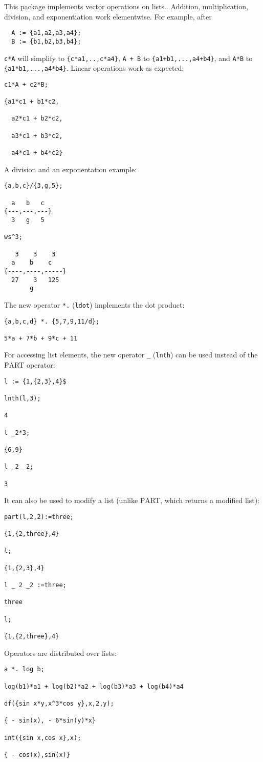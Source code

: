 
This package implements vector operations on lists..
Addition, multiplication, division, and exponentiation work elementwise.
For example, after
\begin{verbatim}
  A := {a1,a2,a3,a4};
  B := {b1,b2,b3,b4};
\end{verbatim}
\texttt{c*A} will simplify to \texttt{\{c*a1,..,c*a4\}}, 
\texttt{A + B} to \texttt{\{a1+b1,...,a4+b4\}}, and
\texttt{A*B} to \texttt{\{a1*b1,...,a4*b4\}}.
Linear operations work as expected:
\begin{verbatim}
c1*A + c2*B;

{a1*c1 + b1*c2,

  a2*c1 + b2*c2,

  a3*c1 + b3*c2,

  a4*c1 + b4*c2}
\end{verbatim}
A division and an exponentation example:
\begin{verbatim}
{a,b,c}/{3,g,5};

  a   b   c
{---,---,---}
  3   g   5

ws^3;

   3    3    3
  a    b    c
{----,----,-----}
  27    3   125
       g
\end{verbatim}
The new operator \texttt{*.} (\texttt{ldot})
 implements
the dot product:
\begin{verbatim}
{a,b,c,d} *. {5,7,9,11/d};

5*a + 7*b + 9*c + 11
\end{verbatim}
For accessing list elements, the new operator \texttt{\_} (\texttt{lnth})
can be used instead of the \f{PART} operator:
\begin{verbatim}
l := {1,{2,3},4}$

lnth(l,3);

4

l _2*3;

{6,9}

l _2 _2;

3
\end{verbatim}
It can also be used to modify a list (unlike \f{PART}, which returns a modified list):
\begin{verbatim}
part(l,2,2):=three;

{1,{2,three},4}

l;

{1,{2,3},4}

l _ 2 _2 :=three;

three

l;

{1,{2,three},4}
\end{verbatim}
Operators are distributed over lists:
\begin{verbatim}
a *. log b;

log(b1)*a1 + log(b2)*a2 + log(b3)*a3 + log(b4)*a4

df({sin x*y,x^3*cos y},x,2,y);

{ - sin(x), - 6*sin(y)*x}

int({sin x,cos x},x);

{ - cos(x),sin(x)}
\end{verbatim}
